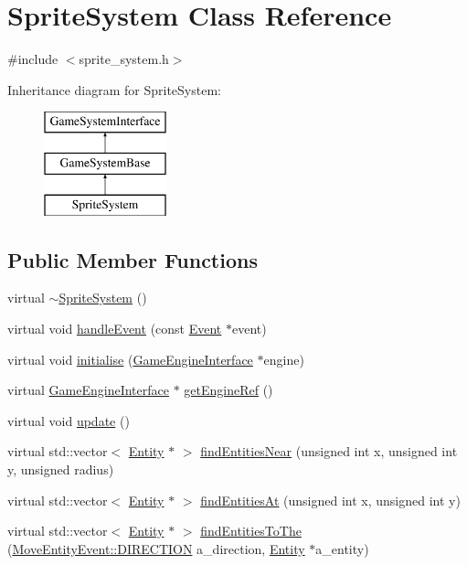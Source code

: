 \hypertarget{classSpriteSystem}{\section{Sprite\-System Class Reference}
\label{classSpriteSystem}
}


{\ttfamily \#include $<$sprite\-\_\-system.\-h$>$}

Inheritance diagram for Sprite\-System\-:\begin{figure}[H]
\begin{center}
\leavevmode
\includegraphics[height=3.000000cm]{classSpriteSystem}
\end{center}
\end{figure}
\subsection*{Public Member Functions}
\begin{DoxyCompactItemize}
\item 
virtual \hyperlink{classSpriteSystem_a7ce2844dbbc680db88085b72e583049a}{$\sim$\-Sprite\-System} ()
\item 
virtual void \hyperlink{classSpriteSystem_a52c4236903911045c117fd4771300faf}{handle\-Event} (const \hyperlink{classEvent}{Event} $\ast$event)
\item 
virtual void \hyperlink{classGameSystemBase_a55b4fc27cbfccd3c724c2e5984d78625}{initialise} (\hyperlink{classGameEngineInterface}{Game\-Engine\-Interface} $\ast$engine)
\item 
virtual \hyperlink{classGameEngineInterface}{Game\-Engine\-Interface} $\ast$ \hyperlink{classGameSystemBase_a1954c5a1c79963554805bc25b2cd6072}{get\-Engine\-Ref} ()
\item 
virtual void \hyperlink{classGameSystemBase_a039d3086ac7fe50abdb110b569520d69}{update} ()
\item 
virtual std\-::vector$<$ \hyperlink{classEntity}{Entity} $\ast$ $>$ \hyperlink{classGameSystemBase_aae270a88f1077a091e6033514b889abd}{find\-Entities\-Near} (unsigned int x, unsigned int y, unsigned radius)
\item 
virtual std\-::vector$<$ \hyperlink{classEntity}{Entity} $\ast$ $>$ \hyperlink{classGameSystemBase_a7aa9912fc078d990dbfb480e411bd3bc}{find\-Entities\-At} (unsigned int x, unsigned int y)
\item 
virtual std\-::vector$<$ \hyperlink{classEntity}{Entity} $\ast$ $>$ \hyperlink{classGameSystemBase_a44456ef40ac565b9d6b65f3b1531a4ef}{find\-Entities\-To\-The} (\hyperlink{classMoveEntityEvent_a7058a943643bee9164a21e62e3392807}{Move\-Entity\-Event\-::\-D\-I\-R\-E\-C\-T\-I\-O\-N} a\-\_\-direction, \hyperlink{classEntity}{Entity} $\ast$a\-\_\-entity)
\end{DoxyCompactItemize}
